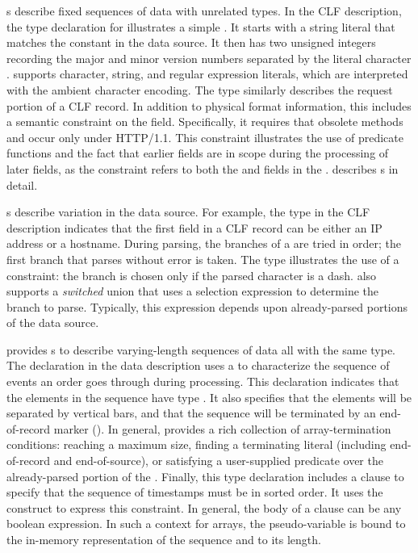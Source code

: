 s describe fixed sequences of data with unrelated types.
In the CLF description, the type declaration for 
illustrates a simple . It starts with a string literal
that matches the constant  in the data source.  It then has
two unsigned integers recording the major and minor version numbers
separated by the literal character .  \pads{} supports
character, string, and regular expression literals, which are
interpreted with the ambient character encoding. The type
 similarly describes the request portion of a CLF
record.  In addition to physical format information, this 
includes a semantic constraint on the  field.
Specifically, it requires that obsolete methods  and
 occur only under HTTP/1.1.  This constraint illustrates
the use of predicate functions and the fact that earlier fields are in
scope during the processing of later fields, as the constraint refers
to both the  and  fields in the .
 describes s in detail.

s describe variation in the data source.  For example, the
 type in the CLF description indicates that the first
field in a CLF record can be either an IP address or a hostname.
During parsing, the branches of a  are tried in order; the
first branch that parses without error is taken.  The 
type illustrates the use of a constraint: the branch 
is chosen only if the parsed character is a dash.  \pads{} also
supports a \textit{switched} union that uses a selection expression to
determine the branch to parse.  Typically, this expression depends
upon already-parsed portions of the data source.

\pads{} provides s to describe varying-length sequences of
data all with the same type.  The  declaration in the
\dibbler{} data description uses a  to characterize the
sequence of events an order goes through during processing.  This
declaration indicates that the elements in the sequence have type
.  It also specifies that the elements will be separated
by vertical bars, and that the sequence will be terminated by an
end-of-record marker ().  In general, \pads{} provides a rich
collection of array-termination conditions: reaching a maximum size,
finding a terminating literal (including end-of-record and
end-of-source), or satisfying a user-supplied predicate over the
already-parsed portion of the .  Finally, this type
declaration includes a  clause to specify that the sequence
of timestamps must be in sorted order.  It uses the 
construct to express this constraint.  In general, the body of a
 clause can be any boolean expression.  In such a context
for arrays, the pseudo-variable  is bound to the in-memory
representation of the sequence and  to its length.

